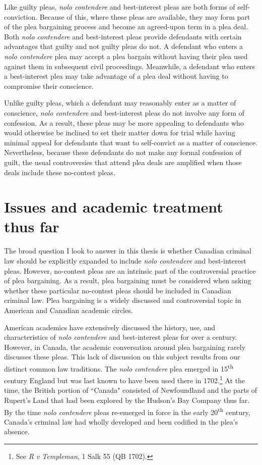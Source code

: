 Like guilty pleas, \textit{nolo contendere} and best-interest pleas are both forms of self-conviction. Because of this, where these pleas are available, they may form part of the plea bargaining process and become an agreed-upon term in a plea deal. Both \textit{nolo contendere} and best-interest pleas provide defendants with certain advantages that guilty and not guilty pleas do not. A defendant who enters a \textit{nolo contendere} plea may accept a plea bargain without having their plea used against them in subsequent civil proceedings. Meanwhile, a defendant who enters a best-interest plea may take advantage of a plea deal without having to compromise their conscience.

Unlike guilty pleas, which a defendant may reasonably enter as a matter of conscience, \textit{nolo contendere} and best-interest pleas do not involve any form of confession. As a result, these pleas may be more appealing to defendants who would otherwise be inclined to set their matter down for trial while having minimal appeal for defendants that want to self-convict as a matter of conscience. Nevertheless, because these defendants do not make any formal confession of guilt, the usual controversies that attend plea deals are amplified when those deals include these no-contest pleas. 

\section{Issues and academic treatment thus far}

The broad question I look to answer in this thesis is whether Canadian criminal law should be explicitly expanded to include \textit{nolo contendere} and best-interest pleas. However, no-contest pleas are an intrinsic part of the controversial practice of plea bargaining. As a result, plea bargaining must be considered when asking whether these particular no-contest pleas should be included in Canadian criminal law. Plea bargaining is a widely discussed and controversial topic in American and Canadian academic circles. 

American academics have extensively discussed the history, use, and characteristics of \textit{nolo contendere} and best-interest pleas for over a century. However, in Canada, the academic conversation around plea bargaining rarely discusses these pleas. This lack of discussion on this subject results from our distinct common law traditions. The \textit{nolo contendere} plea emerged in 15\textsuperscript{th} century England but was last known to have been used there in 1702.\footnote{See \textit{R v Templeman}, 1 Salk 55 (QB 1702).} At the time, the British portion of ``Canada" consisted of Newfoundland and the parts of Rupert's Land that had been explored by the Hudson's Bay Company thus far. By the time \textit{nolo contendere} pleas re-emerged in force in the early 20\textsuperscript{th} century, Canada's criminal law had wholly developed and been codified in the plea's absence.

